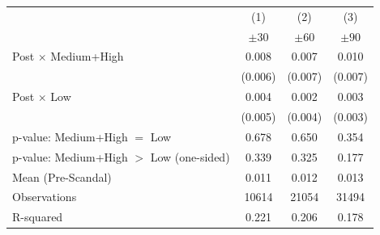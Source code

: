 {
\def\sym#1{\ifmmode^{#1}\else\(^{#1}\)\fi}
\begin{tabular}{l*{3}{c}}
\toprule
            &\multicolumn{1}{c}{(1)}&\multicolumn{1}{c}{(2)}&\multicolumn{1}{c}{(3)}\\
            &\multicolumn{1}{c}{$\pm 30$}&\multicolumn{1}{c}{$\pm 60$}&\multicolumn{1}{c}{$\pm 90$}\\
\midrule
Post $\times$ Medium+High&       0.008         &       0.007         &       0.010         \\
            &     (0.006)         &     (0.007)         &     (0.007)         \\
Post $\times$ Low&       0.004         &       0.002         &       0.003         \\
            &     (0.005)         &     (0.004)         &     (0.003)         \\
\midrule
p-value: Medium+High $=$ Low&       0.678         &       0.650         &       0.354         \\
p-value: Medium+High $>$ Low (one-sided)&       0.339         &       0.325         &       0.177         \\
Mean (Pre-Scandal)&       0.011         &       0.012         &       0.013         \\
Observations&       10614         &       21054         &       31494         \\
R-squared   &       0.221         &       0.206         &       0.178         \\
\bottomrule
\end{tabular}
}
